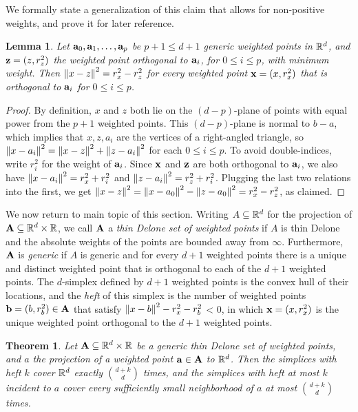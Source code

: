 \documentclass[10pt,a4paper]{article}
\newtheorem{theorem}{Theorem}[section]
\newtheorem{lemma}{Lemma}[section]
\newcommand {\mm}[1] {\ifmmode{#1}\else{\mbox{\(#1\)}}\fi}
\theoremstyle{plain}
\newcommand{\Rspace}        {\mm{{\mathbb R}}}
\newcommand{\AAA}           {\mm{\bf A}}
\newcommand{\aaa}           {\mm{\bf a}}
\newcommand{\bbb}           {\mm{\bf b}}
\newcommand{\xxx}           {\mm{\bf{x}}}
\newcommand{\zzz}           {\mm{\bf{z}}}
\newcommand{\Edist}[2]      {\mm{\|{#1}-{#2}\|}}
\begin{document}
We formally state a generalization of this claim that allows for non-positive weights, and prove it for later reference.
\begin{lemma}
  \label{lem:orthogonal_pencil}
  Let $\aaa_0, \aaa_1, \ldots, \aaa_p$ be $p+1 \leq d+1$ generic weighted points in $\Rspace^d$, and $\zzz = (z, r_z^2)$ the weighted point orthogonal to $\aaa_i$, for $0 \leq i \leq p$, with minimum weight.
  Then $\Edist{x}{z}^2 = r_x^2 - r_z^2$ for every weighted point $\xxx = (x, r_x^2)$ that is orthogonal to $\aaa_i$ for $0 \leq i \leq p$.
\end{lemma}
\begin{proof}
  By definition, $x$ and $z$ both lie on the $(d-p)$-plane of points with equal power from the $p+1$ weighted points.
  This $(d-p)$-plane is normal to $b-a$, which implies that $x, z, a_i$ are the vertices of a right-angled triangle, so $\Edist{x}{a_i}^2 = \Edist{x}{z}^2 + \Edist{z}{a_i}^2$ for each $0 \leq i \leq p$.
  To avoid double-indices, write $r_i^2$ for the weight of $\aaa_i$.
  Since $\xxx$ and $\zzz$ are both orthogonal to $\aaa_i$, we also have $\Edist{x}{a_i}^2 = r_x^2 + r_i^2$ and $\Edist{z}{a_i}^2 = r_z^2 + r_i^2$.
  Plugging the last two relations into the first, we get $\Edist{x}{z}^2 = \Edist{x}{a_0}^2 - \Edist{z}{a_0}^2 = r_x^2 - r_z^2$, as claimed.
\end{proof}
We now return to main topic of this section.
Writing $A \subseteq \Rspace^d$ for the projection of $\AAA \subseteq \Rspace^d \times \Rspace$, we call $\AAA$ a \emph{thin Delone set of weighted points} if $A$ is thin Delone and the absolute weights of the points are bounded away from $\infty$.
Furthermore, $\AAA$ is \emph{generic} if $A$ is generic and for every $d+1$ weighted points there is a unique and distinct weighted point that is orthogonal to each of the $d+1$ weighted points.
The $d$-simplex defined by $d+1$ weighted points is the convex hull of their locations, and the \emph{heft} of this simplex is the number of weighted points $\bbb = (b, r_b^2) \in \AAA$ that satisfy $\Edist{x}{b}^2 - r_x^2 - r_b^2$ < 0, in which $\xxx = (x, r_x^2)$ is the unique weighted point orthogonal to the $d+1$ weighted points.
\begin{theorem}
  \label{thm:covering_for_weighted_points}
  Let $\AAA \subseteq \Rspace^d \times \Rspace$ be a generic thin Delone set of weighted points, and $a$ the projection of a weighted point $\aaa \in \AAA$ to $\Rspace^d$.
  Then the simplices with heft $k$ cover $\Rspace^d$ exactly $\binom{d+k}{d}$ times, and the simplices with heft at most $k$ incident to $a$ cover every sufficiently small neighborhood of $a$ at most $\binom{d+k}{d}$ times.
\end{theorem}
\end{document}

